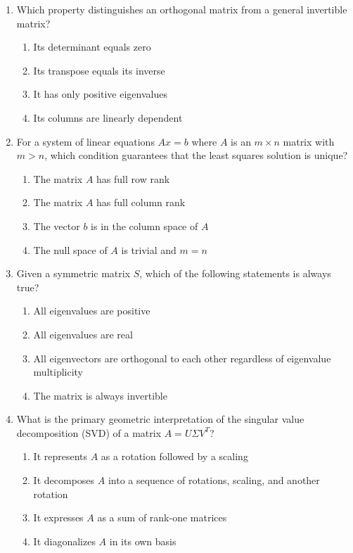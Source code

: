 \documentclass[11pt]{article}
\begin{document}
\begin{enumerate}[label=\textbf{\arabic*.}]

  \item Which property distinguishes an orthogonal matrix from a general invertible matrix?
  \begin{enumerate}[label=(\Alph*)]
    \item Its determinant equals zero
    \item Its transpose equals its inverse
    \item It has only positive eigenvalues
    \item Its columns are linearly dependent
  \end{enumerate}

  \item For a system of linear equations $Ax = b$ where $A$ is an $m \times n$ matrix with $m > n$, 
  which condition guarantees that the least squares solution is unique?
  \begin{enumerate}[label=(\Alph*)]
    \item The matrix $A$ has full row rank
    \item The matrix $A$ has full column rank
    \item The vector $b$ is in the column space of $A$
    \item The null space of $A$ is trivial and $m = n$
  \end{enumerate}

  \item Given a symmetric matrix $S$, which of the following statements is always true?
  \begin{enumerate}[label=(\Alph*)]
    \item All eigenvalues are positive
    \item All eigenvalues are real
    \item All eigenvectors are orthogonal to each other regardless of eigenvalue multiplicity
    \item The matrix is always invertible
  \end{enumerate}

  \item What is the primary geometric interpretation of the singular value decomposition (SVD) 
  of a matrix $A = U\Sigma V^T$?
  \begin{enumerate}[label=(\Alph*)]
    \item It represents $A$ as a rotation followed by a scaling
    \item It decomposes $A$ into a sequence of rotations, scaling, and another rotation
    \item It expresses $A$ as a sum of rank-one matrices
    \item It diagonalizes $A$ in its own basis
  \end{enumerate}


\end{enumerate}
\end{document}
